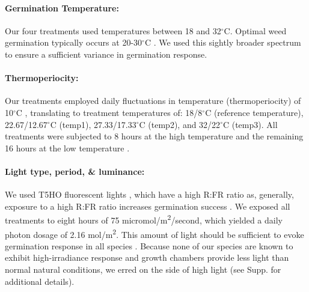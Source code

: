 \documentclass[11pt]{article}\usepackage[]{graphicx}\usepackage[]{color}
\begin{document}
	\paragraph{Germination Temperature:} Our four treatments used temperatures between 18 and 32$^\circ$C. Optimal weed germination typically occurs at 20-30$^\circ$C \parencite{Hartmann2010,Steinbauer1957,Wulff1994,Popay1970}. We used this  sightly broader spectrum to ensure a sufficient variance in germination response.
	
	\paragraph{Thermoperiocity:} Our treatments employed daily fluctuations in temperature (thermoperiocity) of 10$^\circ$C \parencite[see e.g.,][]{Steinbauer1957, Toole1963,ISTA1954}, translating to treatment temperatures of: 18/8$^\circ$C (reference temperature), 22.67/12.67$^\circ$C (temp1), 27.33/17.33$^\circ$C (temp2), and 32/22$^\circ$C (temp3). All treatments were subjected to 8 hours at the high temperature and the remaining 16 hours at the low temperature \parencite{Baskin1998,Roberts1981,Popay1970,Probert2000}. %

	\paragraph{Light type, period, \& luminance:} We used T5HO fluorescent lights \parencite{Toole1963}, which have a high R:FR ratio as, generally, exposure to a high R:FR ratio increases germination success \parencite[though some studies find germination requires high R:FR ratio or is insensitive,][]{Popay1970,Pons2000,Wulff1994}. %
We exposed all treatments to eight hours \parencite[coinciding with the higher temperature,][]{Baskin1998} of 75 micromol/m\textsuperscript{2}/second, which yielded a daily photon dosage of 2.16 mol/m\textsuperscript{2}. This amount of light should be sufficient to evoke germination response in all species \parencite{Pons1991}. Because none of our species are known to exhibit high-irradiance response and  growth chambers provide less light than normal natural conditions, we erred on the side of high light (see Supp. for additional details). 
	
\end{document}
